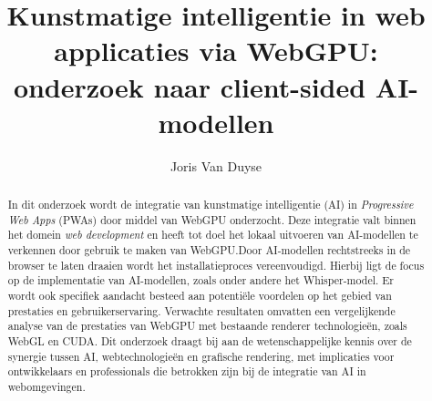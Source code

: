 \documentclass{hogent-article}
\title{Kunstmatige intelligentie in web applicaties via WebGPU: onderzoek naar client-sided AI-modellen}
\author{Joris Van Duyse}
\begin{document}
\begin{abstract}

In dit onderzoek wordt de integratie van kunstmatige intelligentie (AI) in \textit{Progressive Web Apps} (PWAs) door middel van WebGPU onderzocht. Deze integratie valt binnen het domein \textit{web development} en heeft tot doel het lokaal uitvoeren van AI-modellen te verkennen door gebruik te maken van WebGPU.\@ Door AI-modellen rechtstreeks in de browser te laten draaien wordt het installatieproces vereenvoudigd. Hierbij ligt de focus op de implementatie van AI-modellen, zoals onder andere het Whisper-model. Er wordt ook specifiek aandacht besteed aan potentiële voordelen op het gebied van prestaties en gebruikerservaring. Verwachte resultaten omvatten een vergelijkende analyse van de prestaties van WebGPU met bestaande renderer technologieën, zoals WebGL en CUDA. Dit onderzoek draagt bij aan de wetenschappelijke kennis over de synergie tussen AI, webtechnologieën en grafische rendering, met implicaties voor ontwikkelaars en professionals die betrokken zijn bij de integratie van AI in webomgevingen.
\end{abstract}

\tableofcontents



\printbibliography[heading=bibintoc]

\clearpage
\end{document}
